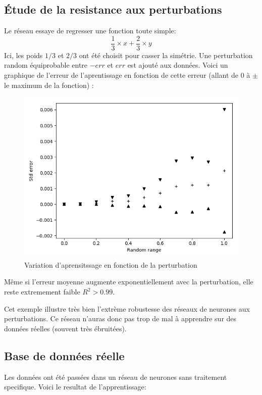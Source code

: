 \subsection{Étude de la resistance aux perturbations}\label{subsec:random}
Le réseau essaye de regresser une fonction toute simple:
\begin{equation}
    \frac{1}{3} \times x + \frac{2}{3} \times y
\end{equation}
Ici, les poids $1/3$ et $2/3$ ont été choisit pour casser la simétrie.
Une perturbation random équiprobable entre $-err$ et $err$ est ajouté aux données.
Voici un graphique de l'erreur de l'aprentissage en fonction de cette erreur
(allant de $0$ à $\pm$ le maximum de la fonction) :
\begin{figure}[H]
    \center
    \includegraphics[height=\moyen]{pict/random.png}
	\caption{Variation d'aprensitssage en fonction de la perturbation}
	\label{fig:obj2tiers1}
\end{figure}

Même si l'erreur moyenne augmente exponentiellement avec la perturbation,
elle reste extremement faible $R^2 > 0.99$.

Cet exemple illustre très bien l'extrème robustesse des réseaux de neurones aux perturbations.
Ce réseau n'auras donc pas trop de mal à apprendre sur des données réelles (souvent très ébruitées).


\subsection{Base de données réelle}\label{subsec:real}
Les données ont été passées dans un réseau de neurones sans traitement specifique.
Voici le resultat de l'apprentissage:

